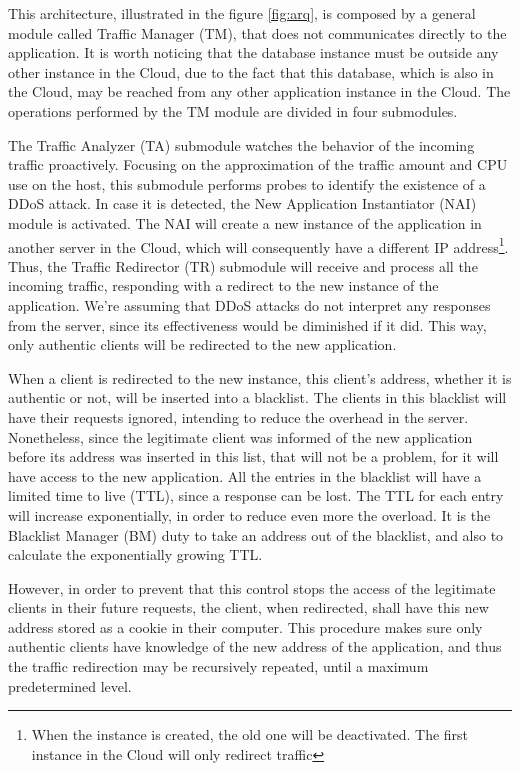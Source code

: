 This architecture, illustrated in the figure \ref{fig:arq}, is composed by a general module called Traffic Manager (TM), that does not communicates directly to the application. It is worth noticing that the database instance must be outside any other instance in the Cloud, due to the fact that this database, which is also in the Cloud, may be reached from any other application instance in the Cloud. The operations performed by the TM module are divided in four submodules.

The Traffic Analyzer (TA) submodule watches the behavior of the incoming traffic proactively. Focusing on the approximation of the traffic amount and CPU use on the host, this submodule performs probes to identify the existence of a DDoS attack. In case it is detected, the New Application Instantiator (NAI) module is activated. The NAI will create a new instance of the application in another server in the Cloud, which will consequently have a different IP address\footnote{When the instance is created, the old one will be deactivated. The first instance in the Cloud will only redirect traffic}. Thus, the Traffic Redirector (TR) submodule will receive and process all the incoming traffic, responding with a redirect to the new instance of the application. We're assuming that DDoS attacks do not interpret any responses from the server, since its effectiveness would be diminished if it did. This way, only authentic clients will be redirected to the new application.

When a client is redirected to the new instance, this client's address, whether it is authentic or not, will be inserted into a blacklist. The clients in this blacklist will have their requests ignored, intending to reduce the overhead in the server. Nonetheless, since the legitimate client was informed of the new application before its address was inserted in this list, that will not be a problem, for it will have access to the new application. All the entries in the blacklist will have a limited time to live (TTL), since a response can be lost. The TTL for each entry will increase exponentially, in order to reduce even more the overload. It is the Blacklist Manager (BM) duty to take an address out of the blacklist, and also to calculate the exponentially growing TTL.

However, in order to prevent that this control stops the access of the legitimate clients in their future requests, the client, when redirected, shall have this new address stored as a cookie in their computer. This procedure makes sure only authentic clients have knowledge of the new address of the application, and thus the traffic redirection may be recursively repeated, until a maximum predetermined level.

